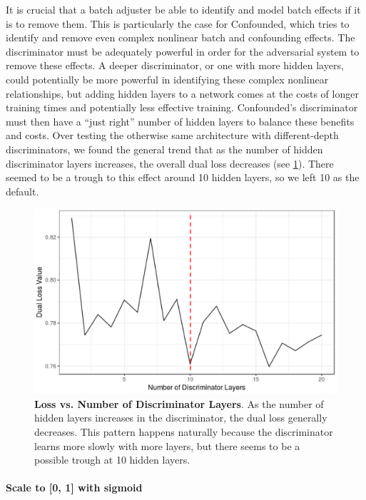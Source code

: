 \documentclass{article}
\begin{document}
It is crucial that a batch adjuster be able to identify and model batch effects if it is to remove them.
This is particularly the case for Confounded, which tries to identify and remove even complex nonlinear batch and confounding effects.
The discriminator must be adequately powerful in order for the adversarial system to remove these effects.
A deeper discriminator, or one with more hidden layers, could potentially be more powerful in identifying these complex nonlinear relationships, but adding hidden layers to a network comes at the costs of longer training times and potentially less effective training. %
Confounded's discriminator must then have a ``just right'' number of hidden layers to balance these benefits and costs.
Over testing the otherwise same architecture with different-depth discriminators, we found the general trend that as the number of hidden discriminator layers increases, the overall dual loss decreases (see \figurename{} \ref{fig:disc}).
There seemed to be a trough to this effect around 10 hidden layers, so we left 10 as the default.

\begin{figure}
	\centering
	\includegraphics[width=\columnwidth]{figures/supplement/disc_layers.png}
	\caption{\textbf{Loss vs. Number of Discriminator Layers}.
	As the number of hidden layers increases in the discriminator, the dual loss generally decreases.
	This pattern happens naturally because the discriminator learns more slowly with more layers, but there seems to be a possible trough at 10 hidden layers.
	}
	\label{fig:disc}
\end{figure}

\paragraph{Scale to [0, 1] with sigmoid}
\end{document}
